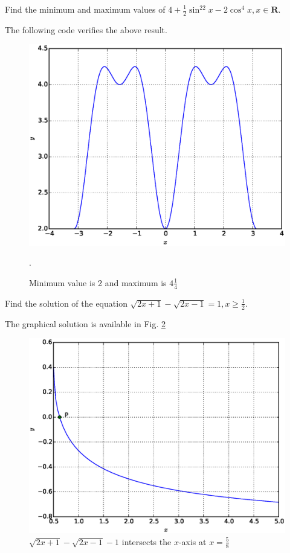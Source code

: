 \documentclass[journal,12pt,twocolumn]{IEEEtran}
\begin{document}
%
\begin{problem}
Find the minimum and maximum values of $4 + \frac{1}{2}\sin^22x - 2\cos^4 x, x \in \mathbf{R}$. 
\end{problem}
\solution 

The following code verifies the above result.

\begin{figure}[h]
\centering
\includegraphics[width=\columnwidth]{./figs/ee16b1014}
\caption{Minimum value is 2 and maximum is $4\frac{1}{4}$}.
\label{fig_14}	
\end{figure}
%
\begin{problem}
Find the solution of the equation $\sqrt{2x+1}- \sqrt{2x-1} = 1, x \geq \frac{1}{2}$.
\end{problem}
\solution

The graphical solution is available in Fig. \ref{fig_15}

\begin{figure}[h]
\centering
\includegraphics[width=\columnwidth]{./figs/ee16b1015}
\caption{ $\sqrt{2x+1}- \sqrt{2x-1} - 1$ intersects the $x$-axis at $x = \frac{5}{8}$}
\label{fig_15}	
\end{figure}
\end{document}
